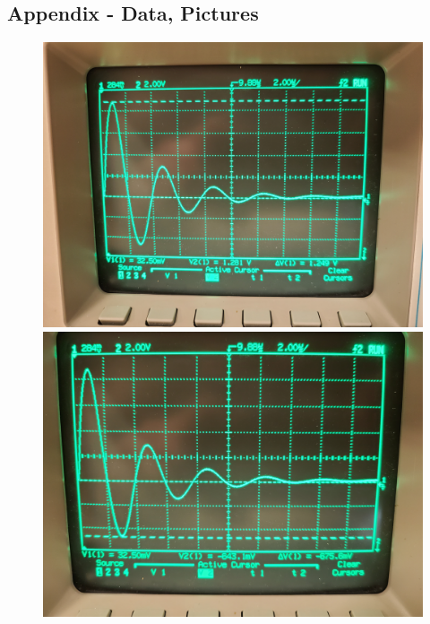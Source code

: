 \documentclass[11pt]{article}
\begin{document}
	\subsection*{Appendix - Data, Pictures}
	\begin{figure}[H]
		\centering
		\includegraphics[width=6.in]{images/20210305_141231.jpg}
		\includegraphics[width=6.in]{images/20210305_141250.jpg}
	\end{figure}
\end{document}
